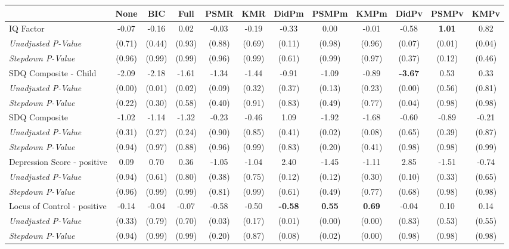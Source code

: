 \begin{tabular}{l c c c c c c c c c c c}
\toprule
 & None & BIC & Full & PSMR & KMR & DidPm & PSMPm & KMPm & DidPv & PSMPv & KMPv \\
\midrule
IQ Factor & -0.07 & -0.16 & 0.02 & -0.03 & -0.19 & -0.33 & 0.00 & -0.01 & -0.58 & \textbf{ 1.01 } & 0.82 \\
\quad \textit{Unadjusted P-Value} & (0.71) & (0.44) & (0.93) & (0.88) & (0.69) & (0.11) & (0.98) & (0.96) & (0.07) & (0.01) & (0.04) \\
\quad \textit{Stepdown P-Value} & (0.96) & (0.99) & (0.99) & (0.96) & (0.99) & (0.61) & (0.99) & (0.97) & (0.37) & (0.12) & (0.46) \\
SDQ Composite - Child & -2.09 & -2.18 & -1.61 & -1.34 & -1.44 & -0.91 & -1.09 & -0.89 & \textbf{ -3.67 } & 0.53 & 0.33 \\
\quad \textit{Unadjusted P-Value} & (0.00) & (0.01) & (0.02) & (0.09) & (0.32) & (0.37) & (0.13) & (0.23) & (0.00) & (0.56) & (0.81) \\
\quad \textit{Stepdown P-Value} & (0.22) & (0.30) & (0.58) & (0.40) & (0.91) & (0.83) & (0.49) & (0.77) & (0.04) & (0.98) & (0.98) \\
SDQ Composite & -1.02 & -1.14 & -1.32 & -0.23 & -0.46 & 1.09 & -1.92 & -1.68 & -0.60 & -0.89 & -0.21 \\
\quad \textit{Unadjusted P-Value} & (0.31) & (0.27) & (0.24) & (0.90) & (0.85) & (0.41) & (0.02) & (0.08) & (0.65) & (0.39) & (0.87) \\
\quad \textit{Stepdown P-Value} & (0.94) & (0.97) & (0.88) & (0.96) & (0.99) & (0.83) & (0.20) & (0.41) & (0.98) & (0.98) & (0.99) \\
Depression Score - positive & 0.09 & 0.70 & 0.36 & -1.05 & -1.04 & 2.40 & -1.45 & -1.11 & 2.85 & -1.51 & -0.74 \\
\quad \textit{Unadjusted P-Value} & (0.94) & (0.61) & (0.80) & (0.38) & (0.75) & (0.12) & (0.12) & (0.30) & (0.10) & (0.33) & (0.65) \\
\quad \textit{Stepdown P-Value} & (0.96) & (0.99) & (0.99) & (0.81) & (0.99) & (0.61) & (0.49) & (0.77) & (0.68) & (0.98) & (0.98) \\
Locus of Control - positive & -0.14 & -0.04 & -0.07 & -0.58 & -0.50 & \textbf{ -0.58 } & \textbf{ 0.55 } & \textbf{ 0.69 } & -0.04 & 0.10 & 0.14 \\
\quad \textit{Unadjusted P-Value} & (0.33) & (0.79) & (0.70) & (0.03) & (0.17) & (0.01) & (0.00) & (0.00) & (0.83) & (0.53) & (0.55) \\
\quad \textit{Stepdown P-Value} & (0.94) & (0.99) & (0.99) & (0.20) & (0.87) & (0.08) & (0.02) & (0.00) & (0.98) & (0.98) & (0.98) \\

\end{tabular}
